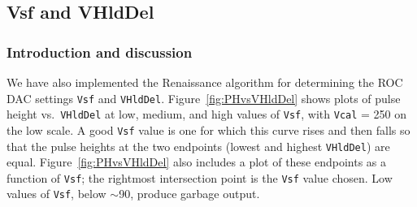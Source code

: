 \subsection{Vsf and VHldDel}

\subsubsection{Introduction and discussion}

We have also implemented the Renaissance algorithm for determining the ROC DAC settings \verb|Vsf| and \verb|VHldDel|.  Figure~\ref{fig:PHvsVHldDel} shows plots of pulse height vs.~\verb|VHldDel| at low, medium, and high values of \verb|Vsf|, with \verb|Vcal| = 250 on the low scale.  A good \verb|Vsf| value is one for which this curve rises and then falls so that the pulse heights at the two endpoints (lowest and highest \verb|VHldDel|) are equal.  Figure~\ref{fig:PHvsVHldDel} also includes a plot of these endpoints as a function of \verb|Vsf|; the rightmost intersection point is the \verb|Vsf| value chosen.  Low values of \verb|Vsf|, below $\sim$90, produce garbage output.


